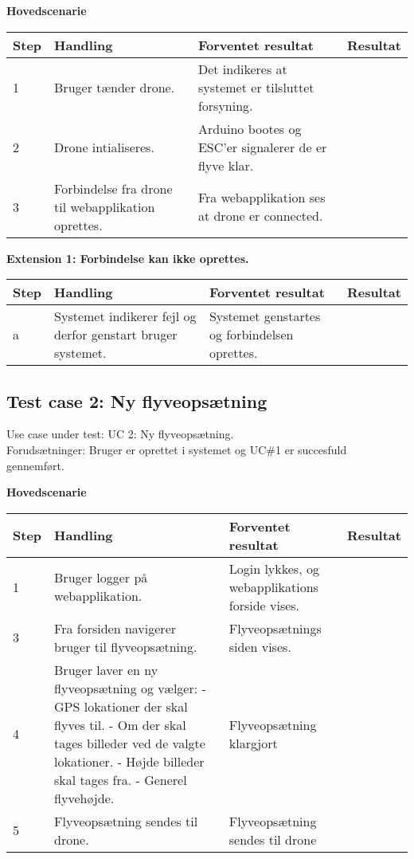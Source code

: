 \textbf{Hovedscenarie}
\begin{table}[H]
	\centering
		\begin{tabular}{|l|p{5 cm}|p{5 cm}|p{3.5 cm}|} 
		\hline
			Step & Handling & Forventet resultat & Resultat\\ \hline
			1 & Bruger tænder drone. & Det indikeres at systemet er tilsluttet forsyning. &   \\ \hline
			2 & Drone intialiseres. & Arduino bootes og ESC'er signalerer de er flyve klar. &   \\ \hline
			3 & Forbindelse fra drone til webapplikation oprettes. & Fra webapplikation ses at drone er connected. &  \\ \hline
		\end{tabular}
\end{table}

\textbf{Extension 1: Forbindelse kan ikke oprettes.}
\begin{table}[H]
	\centering
		\begin{tabular}{|l|p{5 cm}|p{5 cm}|p{3.5 cm}|} 
		\hline
			Step & Handling & Forventet resultat & Resultat\\ \hline
			a & Systemet indikerer fejl og derfor genstart bruger systemet. & Systemet genstartes og forbindelsen oprettes. & \\ \hline
		\end{tabular}
\end{table}

\newpage
\subsection*{Test case 2: Ny flyveopsætning}
Use case under test: UC 2: Ny flyveopsætning.\\
Forudsætninger:	Bruger er oprettet i systemet og UC\#1 er succesfuld gennemført.

\textbf{Hovedscenarie}
\begin{table}[H]
	\centering
		\begin{tabular}{|l|p{5 cm}|p{5 cm}|p{3.5 cm}|} 
		\hline
			Step & Handling & Forventet resultat & Resultat\\ \hline
			1 & Bruger logger på webapplikation. & Login lykkes, og webapplikations forside vises. &  \\ \hline
			3 & Fra forsiden navigerer bruger til flyveopsætning. & Flyveopsætnings siden vises. & \\ \hline
			4 & Bruger laver en ny flyveopsætning og vælger: \newline
				- GPS lokationer der skal flyves til. \newline
				- Om der skal tages billeder ved de valgte lokationer. \newline
				- Højde billeder skal tages fra. \newline
				- Generel flyvehøjde.				
				 & Flyveopsætning klargjort & \\ \hline
			5 & Flyveopsætning sendes til drone. & Flyveopsætning sendes til drone & \\ \hline
		\end{tabular}
\end{table}

